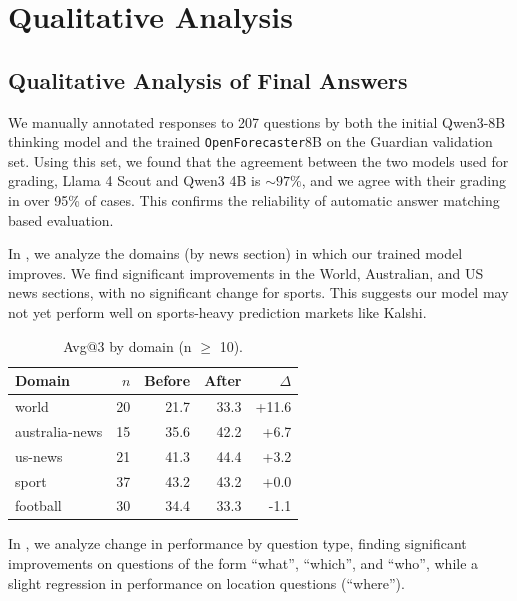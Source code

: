 \documentclass{article} %
\newcommand{\ourmodel}{\texttt{OpenForecaster}}
\begin{document}
\clearpage



\clearpage
\section{Qualitative Analysis}
\label{sec:qualitative_analysis}

\subsection{Qualitative Analysis of Final Answers}
\label{sec:qualia}

We manually annotated responses to 207 questions by both the initial Qwen3-8B thinking model and the trained \ourmodel  8B on the Guardian validation set. Using this set, we found that the agreement between the two models used for grading, Llama 4 Scout and Qwen3 4B is $\sim 97\%$, and we agree with their grading in over 95\% of cases. This confirms the reliability of automatic answer matching based evaluation.

In , we analyze the domains (by news section) in which our trained model improves. We find significant improvements in the World, Australian, and US news sections, with no significant change for sports. This suggests our model may not yet perform well on sports-heavy prediction markets like Kalshi.

\begin{table}[h]
\centering
\begin{tabular}{lrrrr}
\hline
Domain & $n$ & Before & After & $\Delta$ \\ 
\hline
world & 20 & 21.7 & 33.3 & +11.6 \\
australia-news & 15 & 35.6 & 42.2 & +6.7 \\
us-news & 21 & 41.3 & 44.4 & +3.2 \\
sport & 37 & 43.2 & 43.2 & +0.0 \\
football & 30 & 34.4 & 33.3 & -1.1 \\
\hline
\end{tabular}
\caption{Avg@3 by domain (n $\ge$ 10).}
\label{tab:domain}
\end{table}

In , we analyze change in performance by question type, finding significant improvements on questions of the form ``what'', ``which'', and ``who'', while a slight regression in performance on location questions (``where'').
\end{document}
